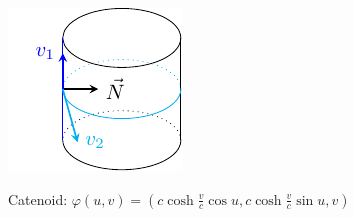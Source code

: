         \begin{center}
            \includegraphics[scale=2]{picture/week7/cylinder7.pdf}

        \end{center}
        \begin{example}\label{normal curvature-catenoid}
            Catenoid: \(\varphi(u,v)=
            \left(c\cosh\frac{v}{c}\cos u,
            c\cosh\frac{v}{c}\sin u,v\right)\)
        \end{example}

